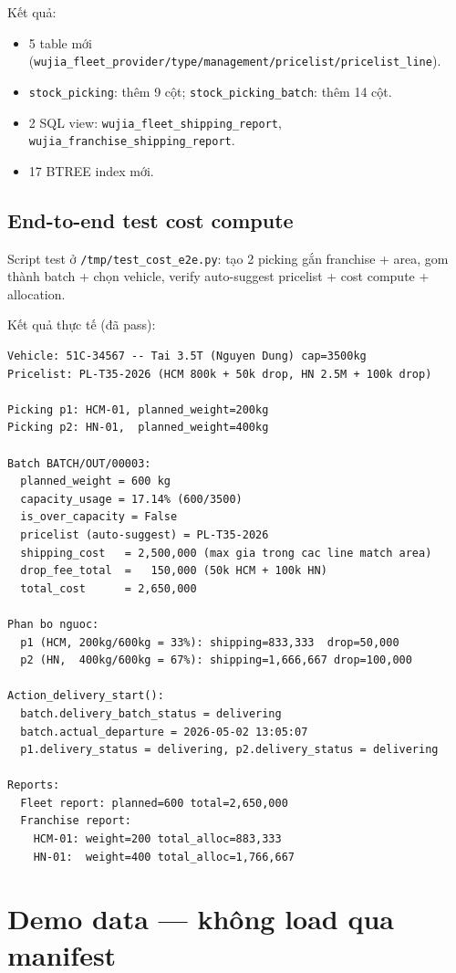 Kết quả:
\begin{itemize}
    \item 5 table mới (\texttt{wujia\_fleet\_provider/type/management/pricelist/pricelist\_line}).
    \item \texttt{stock\_picking}: thêm 9 cột; \texttt{stock\_picking\_batch}: thêm 14 cột.
    \item 2 SQL view: \texttt{wujia\_fleet\_shipping\_report}, \texttt{wujia\_franchise\_shipping\_report}.
    \item 17 BTREE index mới.
\end{itemize}

\subsection{End-to-end test cost compute}

Script test ở \texttt{/tmp/test\_cost\_e2e.py}: tạo 2 picking gắn franchise + area, gom thành batch + chọn vehicle, verify auto-suggest pricelist + cost compute + allocation.

Kết quả thực tế (đã pass):

\begin{lstlisting}[style=shell]
Vehicle: 51C-34567 -- Tai 3.5T (Nguyen Dung) cap=3500kg
Pricelist: PL-T35-2026 (HCM 800k + 50k drop, HN 2.5M + 100k drop)

Picking p1: HCM-01, planned_weight=200kg
Picking p2: HN-01,  planned_weight=400kg

Batch BATCH/OUT/00003:
  planned_weight = 600 kg
  capacity_usage = 17.14% (600/3500)
  is_over_capacity = False
  pricelist (auto-suggest) = PL-T35-2026
  shipping_cost   = 2,500,000 (max gia trong cac line match area)
  drop_fee_total  =   150,000 (50k HCM + 100k HN)
  total_cost      = 2,650,000

Phan bo nguoc:
  p1 (HCM, 200kg/600kg = 33%): shipping=833,333  drop=50,000
  p2 (HN,  400kg/600kg = 67%): shipping=1,666,667 drop=100,000

Action_delivery_start():
  batch.delivery_batch_status = delivering
  batch.actual_departure = 2026-05-02 13:05:07
  p1.delivery_status = delivering, p2.delivery_status = delivering

Reports:
  Fleet report: planned=600 total=2,650,000
  Franchise report:
    HCM-01: weight=200 total_alloc=883,333
    HN-01:  weight=400 total_alloc=1,766,667
\end{lstlisting}

\section{Demo data --- không load qua manifest}

